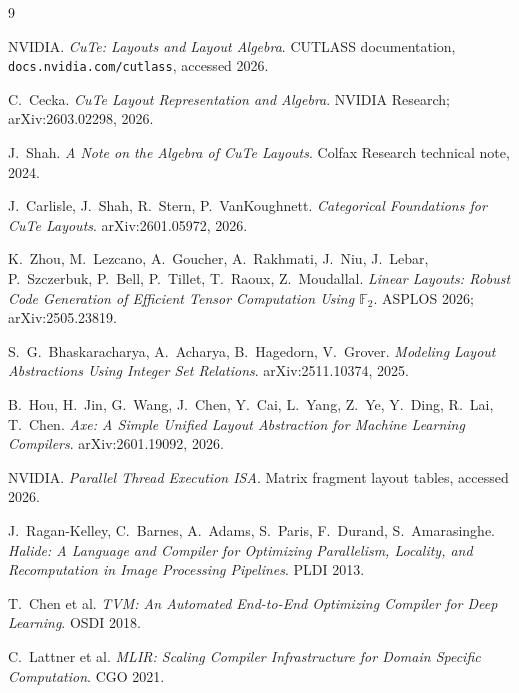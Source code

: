 \documentclass[11pt]{article}
\theoremstyle{definition}
\begin{document}
\begin{thebibliography}{9}

NVIDIA. \emph{CuTe: Layouts and Layout Algebra}. CUTLASS documentation,
\texttt{docs.nvidia.com/cutlass}, accessed 2026.

C.~Cecka. \emph{CuTe Layout Representation and Algebra}. NVIDIA Research;
arXiv:2603.02298, 2026.

J.~Shah. \emph{A Note on the Algebra of CuTe Layouts}. Colfax Research
technical note, 2024.

J.~Carlisle, J.~Shah, R.~Stern, P.~VanKoughnett.
\emph{Categorical Foundations for CuTe Layouts}. arXiv:2601.05972, 2026.

K.~Zhou, M.~Lezcano, A.~Goucher, A.~Rakhmati, J.~Niu, J.~Lebar, P.~Szczerbuk,
P.~Bell, P.~Tillet, T.~Raoux, Z.~Moudallal. \emph{Linear Layouts: Robust Code
Generation of Efficient Tensor Computation Using $\mathbb{F}_2$}. ASPLOS 2026;
arXiv:2505.23819.

S.~G.~Bhaskaracharya, A.~Acharya, B.~Hagedorn, V.~Grover. \emph{Modeling
Layout Abstractions Using Integer Set Relations}. arXiv:2511.10374, 2025.

B.~Hou, H.~Jin, G.~Wang, J.~Chen, Y.~Cai, L.~Yang, Z.~Ye, Y.~Ding, R.~Lai,
T.~Chen. \emph{Axe: A Simple Unified Layout Abstraction for Machine Learning
Compilers}. arXiv:2601.19092, 2026.

NVIDIA. \emph{Parallel Thread Execution ISA}. Matrix fragment layout tables,
accessed 2026.

J.~Ragan-Kelley, C.~Barnes, A.~Adams, S.~Paris, F.~Durand, S.~Amarasinghe.
\emph{Halide: A Language and Compiler for Optimizing Parallelism, Locality,
and Recomputation in Image Processing Pipelines}. PLDI 2013.

T.~Chen et al. \emph{TVM: An Automated End-to-End Optimizing Compiler for
Deep Learning}. OSDI 2018.

C.~Lattner et al. \emph{MLIR: Scaling Compiler Infrastructure for Domain
Specific Computation}. CGO 2021.

\end{thebibliography}
\end{document}
